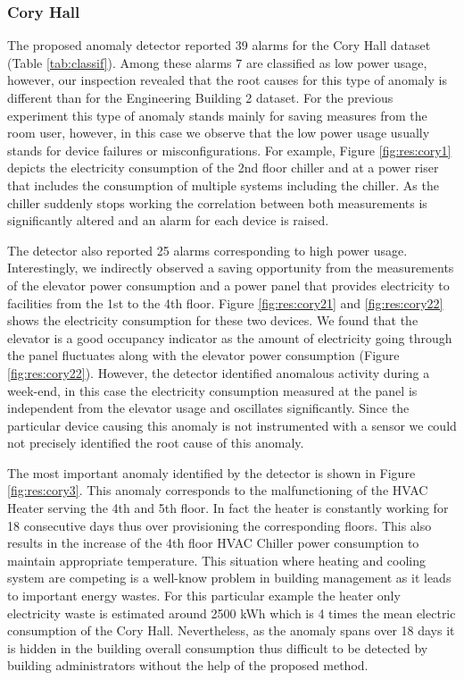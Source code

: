 \subsubsection{Cory Hall}
The proposed anomaly detector reported 39 alarms for the Cory Hall dataset (Table \ref{tab:classif}).
Among these alarms 7 are classified as low power usage, however, our inspection revealed that the root causes for this type of anomaly is different than for the Engineering Building 2 dataset.
For the previous experiment this type of anomaly stands mainly for saving measures from the room user, however, in this case we observe that the low power usage usually stands for device failures or misconfigurations.
For example, Figure \ref{fig:res:cory1} depicts the electricity consumption of the 2nd floor chiller and at a power riser that includes the consumption of multiple systems including the chiller.
As the chiller suddenly stops working the correlation between both measurements is significantly altered and an alarm for each device is raised.

The detector also reported 25 alarms corresponding to high power usage. 
Interestingly, we indirectly observed a saving opportunity from the measurements of the elevator power consumption and a power panel that provides electricity to facilities from the 1st to the 4th floor.
Figure \ref{fig:res:cory21} and \ref{fig:res:cory22} shows the electricity consumption for these two devices. 
We found that the elevator is a good occupancy indicator as the amount of electricity going through the panel fluctuates along with the elevator power consumption (Figure \ref{fig:res:cory22}).
However, the detector identified anomalous activity during a week-end, in this case the electricity consumption measured at the panel is independent from the elevator usage and oscillates significantly.
Since the particular device causing this anomaly is not instrumented with a sensor we could not precisely identified the root cause of this anomaly.

The most important anomaly identified by the detector is shown in Figure \ref{fig:res:cory3}.
This anomaly corresponds to the malfunctioning of the HVAC Heater serving the 4th and 5th floor. 
In fact the heater is constantly working for 18 consecutive days thus over provisioning the corresponding floors.
This also results in the increase of the 4th floor HVAC Chiller power consumption to maintain appropriate temperature.
This situation where heating and cooling system are competing is a well-know problem in building management as it leads to important energy wastes.
For this particular example the heater only electricity waste is estimated around 2500 kWh which is 4 times the mean electric consumption of the Cory Hall.
Nevertheless, as the anomaly spans over 18 days it is hidden in the building overall consumption thus difficult to be detected by building administrators without the help of the proposed method.

